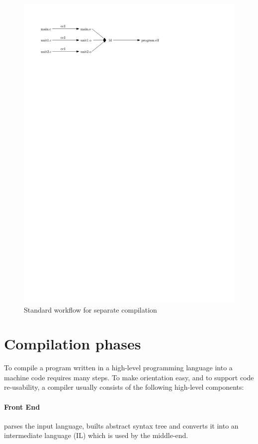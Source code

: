 \begin{figure}[h!]
\centering
\includegraphics{./img/non-lto-workflow.pdf}
\caption{Standard workflow for separate compilation}
\label{figure-non-lto-workflow}
\end{figure}


\section{Compilation phases}

To compile a program written in a high-level programming language into a machine
code requires many steps. To make orientation easy, and to support code
re-usability, a compiler usually consists of the following high-level components:

\paragraph{Front End} parses the input language, builts abstract syntax
tree and converts it into an intermediate language (IL) which is used by the
middle-end.

